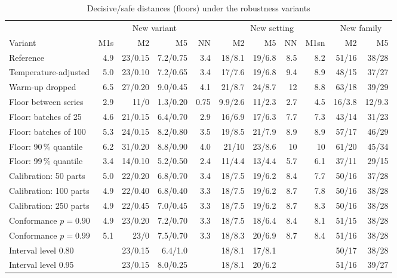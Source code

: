 \documentclass[pdflatex,sn-basic,lineno]{sn-jnl}
\newcommand{\tabsizesmall}{\footnotesize}%
\begin{document}
\begin{appendices}
\begin{table}[p]
\tabsizesmall
\setlength{\tabcolsep}{1.4pt}
\caption{Decisive/safe distances (floors) under the robustness variants}\label{tab:robust}
\begin{tabular}{@{}lrrrrrrrrrr@{}}
\toprule
 & \multicolumn{4}{c}{New variant} & \multicolumn{4}{c}{New setting} & \multicolumn{2}{c}{New family} \\
\cmidrule(lr){2-5}\cmidrule(lr){6-9}\cmidrule(lr){10-11}
Variant & M1s & M2 & M5 & NN & M2 & M5 & NN & M1sn & M2 & M5 \\
\midrule
Reference & 4.9 & 23/0.15 & 7.2/0.75 & 3.4 & 18/8.1 & 19/6.8 & 8.5 & 8.2 & 51/16 & 38/28 \\
Temperature-adjusted & 5.0 & 23/0.10 & 7.2/0.65 & 3.4 & 17/7.6 & 19/6.8 & 9.4 & 8.9 & 48/15 & 37/27 \\
Warm-up dropped & 6.5 & 27/0.20 & 9.0/0.45 & 4.1 & 21/8.7 & 24/8.7 & 12 & 8.8 & 63/18 & 39/29 \\
Floor between series & 2.9 & 11/0 & 1.3/0.20 & 0.75 & 9.9/2.6 & 11/2.3 & 2.7 & 4.5 & 16/3.8 & 12/9.3 \\
Floor: batches of 25 & 4.6 & 21/0.15 & 6.4/0.70 & 2.9 & 16/6.9 & 17/6.3 & 7.7 & 7.3 & 43/14 & 31/23 \\
Floor: batches of 100 & 5.3 & 24/0.15 & 8.2/0.80 & 3.5 & 19/8.5 & 21/7.9 & 8.9 & 8.9 & 57/17 & 46/29 \\
Floor: 90\,\% quantile & 6.2 & 31/0.20 & 8.8/0.90 & 4.0 & 21/10 & 23/8.6 & 10 & 10 & 61/20 & 45/34 \\
Floor: 99\,\% quantile & 3.4 & 14/0.10 & 5.2/0.50 & 2.4 & 11/4.4 & 13/4.4 & 5.7 & 6.1 & 37/11 & 29/15 \\
Calibration: 50 parts & 5.0 & 22/0.20 & 6.8/0.70 & 3.4 & 18/7.5 & 19/6.2 & 8.4 & 7.7 & 50/16 & 37/28 \\
Calibration: 100 parts & 4.9 & 22/0.40 & 6.8/0.40 & 3.3 & 18/7.5 & 19/6.2 & 8.7 & 7.8 & 50/16 & 38/28 \\
Calibration: 250 parts & 4.9 & 22/0.45 & 7.0/0.45 & 3.3 & 18/7.5 & 19/6.2 & 8.7 & 8.3 & 50/16 & 38/28 \\
Conformance $p=0.90$ & 4.9 & 23/0.20 & 7.2/0.70 & 3.3 & 18/7.5 & 18/6.4 & 8.4 & 8.1 & 51/15 & 38/28 \\
Conformance $p=0.99$ & 5.1 & 23/0 & 7.5/0.70 & 3.3 & 18/8.3 & 20/6.9 & 8.7 & 8.4 & 51/16 & 38/28 \\
Interval level 0.80 &  & 23/0.15 & 6.4/1.0 &  & 18/8.1 & 17/8.1 &  &  & 50/17 & 38/28 \\
Interval level 0.95 &  & 23/0.15 & 8.0/0.25 &  & 18/8.1 & 20/6.2 &  &  & 51/16 & 39/27 \\

\end{tabular}
\end{table}
\end{appendices}
\end{document}
